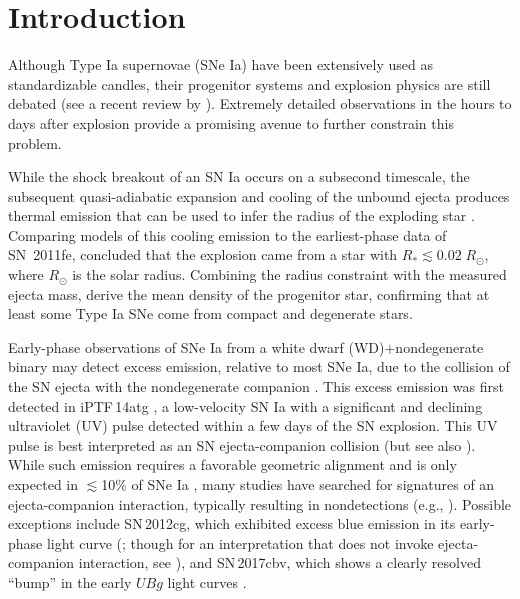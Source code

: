 \documentclass[twocolumn]{aastex61}
\newcommand{\sr}{R_\odot}
\begin{document}

\section{Introduction}
\label{sec:intro}

Although Type Ia supernovae (SNe Ia) have been extensively used as
standardizable candles, their progenitor systems and explosion physics are
still debated (see a recent review by \citealt{2014ARA&A..52..107M}).
Extremely detailed observations in the hours to days after explosion provide
a promising avenue to further constrain this problem.

While the shock breakout of an SN Ia occurs on a subsecond timescale, the
subsequent quasi-adiabatic expansion and cooling of the unbound ejecta
produces thermal emission that can be used to infer the radius of the
exploding star \citep{2010ApJ...708..598P,2011ApJ...728...63R}. Comparing
models of this cooling emission to the earliest-phase data of SN~2011fe,
\citet{2012ApJ...744L..17B} concluded that the explosion came from a star
with $R_\ast \lesssim 0.02\;\sr$, where $\sr$ is the solar radius. Combining
the radius constraint with the measured ejecta mass,
\citeauthor{2012ApJ...744L..17B} derive the mean density of the progenitor
star, confirming that at least some Type Ia SNe come from compact and
degenerate stars.

Early-phase observations of SNe Ia from a white dwarf (WD)$+$nondegenerate
binary may detect excess emission, relative to most SNe Ia, due to the
collision of the SN ejecta with the nondegenerate companion
\citep{1973ApJ...186.1007W,2010ApJ...708.1025K}. This excess emission was
first detected in iPTF\,14atg \citep{2015Natur.521..328C}, a low-velocity SN
Ia with a significant and declining ultraviolet (UV) pulse detected within a
few days of the SN explosion. This UV pulse is best interpreted as an SN
ejecta-companion collision (but see also
\citealt{2016MNRAS.459.4428K,2017MNRAS.472.2787N}). While such emission
requires a favorable geometric alignment and is only expected in
$\lesssim$10\% of SNe Ia \citep{2010ApJ...708.1025K}, many studies have
searched for signatures of an ejecta-companion interaction, typically
resulting in nondetections (e.g.,
\citealt{2010ApJ...722.1691H,2011ApJ...741...20B,2012ApJ...744...38F,
2012ApJ...744L..17B,2015Natur.521..332O,
2013ApJ...778L..15Z,2015ApJ...799..106G,2016ApJ...826..144S,
2015ApJS..221...22I}). Possible exceptions include SN\,2012cg, which
exhibited excess blue emission in its early-phase light curve
(\citealt{2016ApJ...820...92M}; though for an interpretation that does not
invoke ejecta-companion interaction, see \citealt{2016arXiv161007601S}), and
SN\,2017cbv, which shows a clearly resolved ``bump'' in the early $UBg$
light curves \citep{2017ApJ...845L..11H}.
\end{document}
